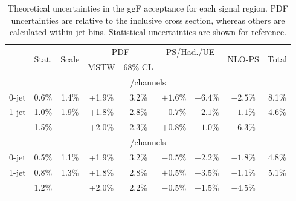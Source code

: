 \begin{table}[b]
	\begin{tabular}{r|ccccccc|c}
		\toprule
		& \multirow{2}{*}{Stat.} & \multirow{2}{*}{Scale} & \multicolumn{2}{c}{PDF} & \multicolumn{2}{c}{PS/Had./UE} & \multirow{2}{*}{NLO-PS} & \multirow{2}{*}{Total} \\
		& & & MSTW & 68\% CL & \pythia{6} & \fherwig & & \\
		\midrule
		\multicolumn{9}{c}{\eech/\mmch channels} \\
		\midrule
		0-jet   & 0.6\% & 1.4\% & +1.9\% & 3.2\% & $+1.6\%$ & $+6.4\%$ & $-2.5\%$ & 8.1\% \\
		1-jet   & 1.0\% & 1.9\% & +1.8\% & 2.8\% & $-0.7\%$ & $+2.1\%$ & $-1.1\%$ & 4.6\% \\
		\twojet & 1.5\% &       & +2.0\% & 2.3\% & $+0.8\%$ & $-1.0\%$ & $-6.3\%$ &  \\
		\midrule
		\multicolumn{9}{c}{\emch/\mech channels} \\
		\midrule
		0-jet   & 0.5\% & 1.1\% & +1.9\% & 3.2\% & $-0.5\%$ & $+2.2\%$ & $-1.8\%$ & 4.8\% \\
		1-jet   & 0.8\% & 1.3\% & +1.8\% & 2.8\% & $+0.5\%$ & $+3.5\%$ & $-1.1\%$ & 5.1\% \\
		\twojet & 1.2\% &       & +2.0\% & 2.2\% & $-0.5\%$ & $+1.5\%$ & $-4.5\%$ &  \\
		\bottomrule
	\end{tabular}
	\caption{Theoretical uncertainties in the ggF acceptance for each signal region. PDF 
	uncertainties are relative to the inclusive cross section, whereas others are 
	calculated within jet bins. Statistical uncertainties are shown for reference.}
	\label{tab:signal:acc_unc_summary}
\end{table}

